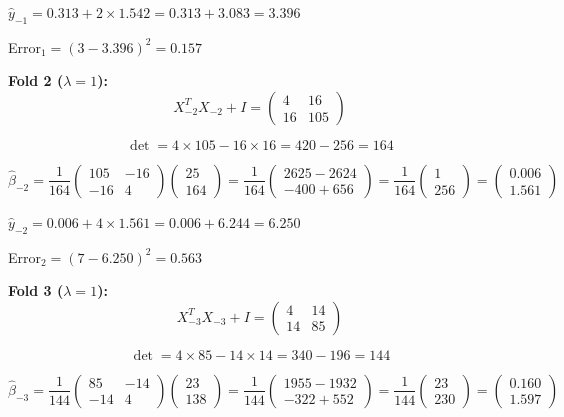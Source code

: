 \documentclass[12pt]{article}
\begin{document}
\begin{solution}
$\hat{y}_{-1} = 0.313 + 2 \times 1.542 = 0.313 + 3.083 = 3.396$

Error$_1 = (3 - 3.396)^2 = 0.157$

\textbf{Fold 2 ($\lambda = 1$):}
\[X_{-2}^TX_{-2} + I = \begin{pmatrix} 4 & 16 \\ 16 & 105 \end{pmatrix}\]

\[\det = 4 \times 105 - 16 \times 16 = 420 - 256 = 164\]

\[\hat{\beta}_{-2} = \frac{1}{164}\begin{pmatrix} 105 & -16 \\ -16 & 4 \end{pmatrix}\begin{pmatrix} 25 \\ 164 \end{pmatrix} = \frac{1}{164}\begin{pmatrix} 2625 - 2624 \\ -400 + 656 \end{pmatrix} = \frac{1}{164}\begin{pmatrix} 1 \\ 256 \end{pmatrix} = \begin{pmatrix} 0.006 \\ 1.561 \end{pmatrix}\]

$\hat{y}_{-2} = 0.006 + 4 \times 1.561 = 0.006 + 6.244 = 6.250$

Error$_2 = (7 - 6.250)^2 = 0.563$

\textbf{Fold 3 ($\lambda = 1$):}
\[X_{-3}^TX_{-3} + I = \begin{pmatrix} 4 & 14 \\ 14 & 85 \end{pmatrix}\]

\[\det = 4 \times 85 - 14 \times 14 = 340 - 196 = 144\]

\[\hat{\beta}_{-3} = \frac{1}{144}\begin{pmatrix} 85 & -14 \\ -14 & 4 \end{pmatrix}\begin{pmatrix} 23 \\ 138 \end{pmatrix} = \frac{1}{144}\begin{pmatrix} 1955 - 1932 \\ -322 + 552 \end{pmatrix} = \frac{1}{144}\begin{pmatrix} 23 \\ 230 \end{pmatrix} = \begin{pmatrix} 0.160 \\ 1.597 \end{pmatrix}\]


\end{solution}
\end{document}
